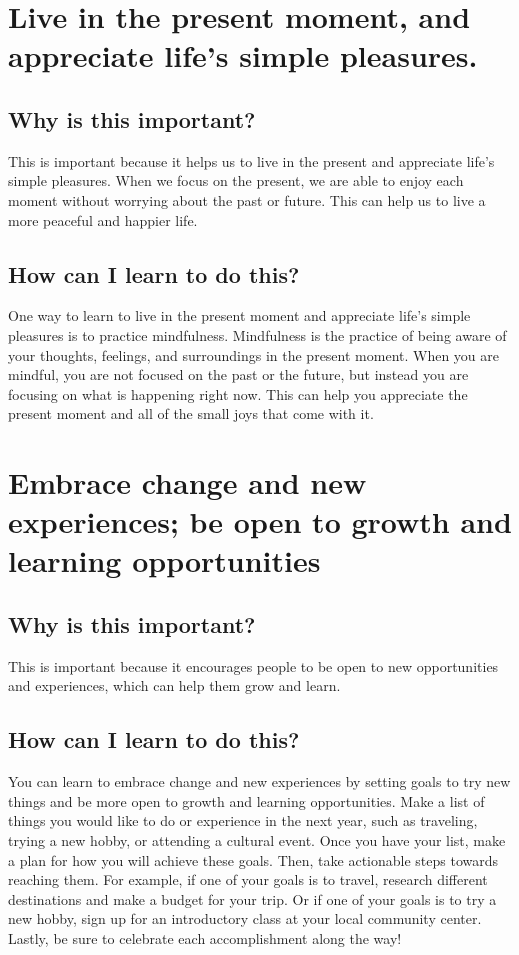 \documentclass[11pt]{article}
\begin{document}
\section{Live in the present moment, and appreciate life’s simple pleasures.}
\label{sec:org110f8a0}
\subsection{Why is this important?}
\label{sec:orga9a1154}
This is important because it helps us to live in the present and appreciate life's simple pleasures. When we focus on the present, we are able to enjoy each moment without worrying about the past or future. This can help us to live a more peaceful and happier life.

\subsection{How can I learn to do this?}
\label{sec:orgf8418f3}
One way to learn to live in the present moment and appreciate life's simple pleasures is to practice mindfulness. Mindfulness is the practice of being aware of your thoughts, feelings, and surroundings in the present moment. When you are mindful, you are not focused on the past or the future, but instead you are focusing on what is happening right now. This can help you appreciate the present moment and all of the small joys that come with it.

\section{Embrace change and new experiences; be open to growth and learning opportunities}
\label{sec:orgd5b2380}
\subsection{Why is this important?}
\label{sec:org6da5da7}
This is important because it encourages people to be open to new opportunities and experiences, which can help them grow and learn.

\subsection{How can I learn to do this?}
\label{sec:org8d4d9ce}
You can learn to embrace change and new experiences by setting goals to try new things and be more open to growth and learning opportunities. Make a list of things you would like to do or experience in the next year, such as traveling, trying a new hobby, or attending a cultural event. Once you have your list, make a plan for how you will achieve these goals. Then, take actionable steps towards reaching them. For example, if one of your goals is to travel, research different destinations and make a budget for your trip. Or if one of your goals is to try a new hobby, sign up for an introductory class at your local community center. Lastly, be sure to celebrate each accomplishment along the way!
\end{document}
